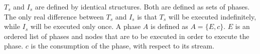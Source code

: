 $T_s$ and $I_s$ are defined by identical structures.  Both are
defined as sets of phases. The only real difference between $T_s$
and $I_s$ is that $T_s$ will be executed indefinitely, while $I_s$
will be executed only once. A phase $A$ is defined as $A = \{E,
c\}$.  $E$ is an ordered list of phases and nodes that are to be
executed in order to execute the phase.  $c$ is the consumption of
the phase, with respect to its stream.

\begin{comment}
As an example, here is a minimal latency schedule for the sample
stream in Figure \ref{fig:sample-sj}.  First, the schedule for the
internal {\splitjoin}:

\begin{displaymath} \small
P_{sj} = \left\{
\begin{array}{c}
T_{sj} = \left\{
\begin{array}{c}
A_{sj,0} = \left\{\{\{6\ split\}\{2C\}\{5D\}\ join\},
\left[\begin{array}{c}12\\12\\12\end{array}\right]\right\}, \\
A_{sj,1} = \left\{\{\{3\ split\}C\{4D\}\ join\},
\left[\begin{array}{c}6\\6\\12\end{array}\right]\right\}
\end{array}\right\}, \\
I_{sj} = \left\{ \right\}, \\
c_{sj} = \left[ \begin{array}{c} 18 \\ 18 \\ 24 \end{array}
\right], c^i_{sj} = \left[ \begin{array}{c} 0 \\ 0 \\ 0
\end{array} \right]
\end{array} \right\}
\end{displaymath}

\noindent And the following is a schedule for the {\pipeline}:


\end{comment}
